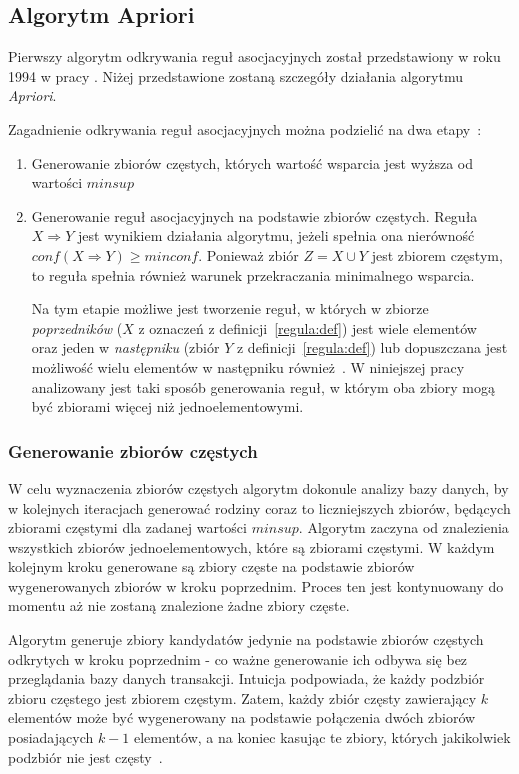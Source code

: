 \subsection{Algorytm Apriori}
Pierwszy algorytm odkrywania reguł asocjacyjnych został przedstawiony w roku 1994 w pracy \cite{Apriori:Main}. Niżej przedstawione zostaną szczegóły działania algorytmu \emph{Apriori}.

Zagadnienie odkrywania reguł asocjacyjnych można podzielić na dwa etapy~\cite{Problem:Statement}:
\begin{enumerate}
	\item Generowanie zbiorów częstych, których wartość wsparcia jest wyższa od wartości $minsup$
	\item Generowanie reguł asocjacyjnych na podstawie zbiorów częstych. Reguła $X \Rightarrow Y$ jest wynikiem działania algorytmu, jeżeli spełnia ona nierówność $conf(X \Rightarrow Y) \geq minconf$. Ponieważ zbiór $Z = X \cup Y$ jest zbiorem częstym, to reguła spełnia również warunek przekraczania minimalnego wsparcia.

	Na tym etapie możliwe jest tworzenie reguł, w których w zbiorze \emph{poprzedników} ($X$ z oznaczeń z definicji~\ref{regula:def}) jest wiele elementów~\cite{Problem:Statement} oraz jeden w \emph{następniku} (zbiór $Y$ z definicji~\ref{regula:def}) lub dopuszczana jest możliwość wielu elementów w następniku również~\cite{Apriori:Main}. W niniejszej pracy analizowany jest taki sposób generowania reguł, w którym oba zbiory mogą być zbiorami więcej niż jednoelementowymi.
\end{enumerate}

\subsubsection{Generowanie zbiorów częstych}\label{apriori:gen}
W celu wyznaczenia zbiorów częstych algorytm dokonule analizy bazy danych, by w kolejnych iteracjach generować rodziny coraz to liczniejszych zbiorów, będących zbiorami częstymi dla zadanej wartości $minsup$. Algorytm zaczyna od znalezienia wszystkich zbiorów jednoelementowych, które są zbiorami częstymi. W każdym kolejnym kroku generowane są zbiory częste na podstawie zbiorów wygenerowanych zbiorów w kroku poprzednim. Proces ten jest kontynuowany do momentu aż nie zostaną znalezione żadne zbiory częste.

Algorytm generuje zbiory kandydatów jedynie na podstawie zbiorów częstych odkrytych w kroku poprzednim - co ważne generowanie ich odbywa się bez przeglądania bazy danych transakcji. Intuicja podpowiada, że każdy podzbiór zbioru częstego jest zbiorem częstym. Zatem, każdy zbiór częsty zawierający $k$ elementów może być wygenerowany na podstawie połączenia dwóch zbiorów posiadających $k-1$ elementów, a na koniec kasując te zbiory, których jakikolwiek podzbiór nie jest częsty~\cite{Apriori:Main}.

